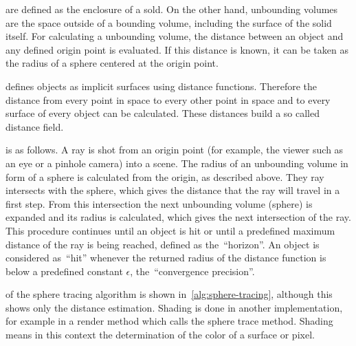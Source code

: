 \documentclass[%
    a4paper,    %
    justified,  %
    nobib,      %
    openany     %
]{tufte-book}
\begin{document}
 are defined as the enclosure of a sold. On the
other hand, unbounding volumes are the space outside of a bounding volume,
including the surface of the solid itself. For calculating a unbounding volume,
the distance between an object and any defined origin point is evaluated. If
this distance is known, it can be taken as the radius of a sphere centered at
the origin point.

 defines objects as implicit surfaces using distance
functions. Therefore the distance from every point in space to every other point
in space and to every surface of every object can be calculated. These distances
build a so called distance field.

 is as follows. A ray is shot
from an origin point (for example, the viewer such as an eye or a pinhole camera) into a scene.
The radius of an unbounding volume in form of a sphere is calculated from
the origin, as described above. They ray intersects with the sphere, which gives
the distance that the ray will travel in a first step. From this
intersection the next unbounding volume (sphere) is expanded and its radius is
calculated, which gives the next intersection of the ray. This procedure
continues until an object is hit or until a predefined maximum distance of
the ray is being reached, defined as the~\enquote{horizon}. An object is
considered as~\enquote{hit} whenever the
returned radius of the distance function is below a predefined constant
$\epsilon$, the~\enquote{convergence precision}.

 of the sphere tracing algorithm is shown
in~\autoref{alg:sphere-tracing}, although this shows only the distance
estimation. Shading is done in another implementation, for example in a
render method which calls the sphere trace method. Shading means in this context
the determination of the color of a surface or pixel.
\end{document}
